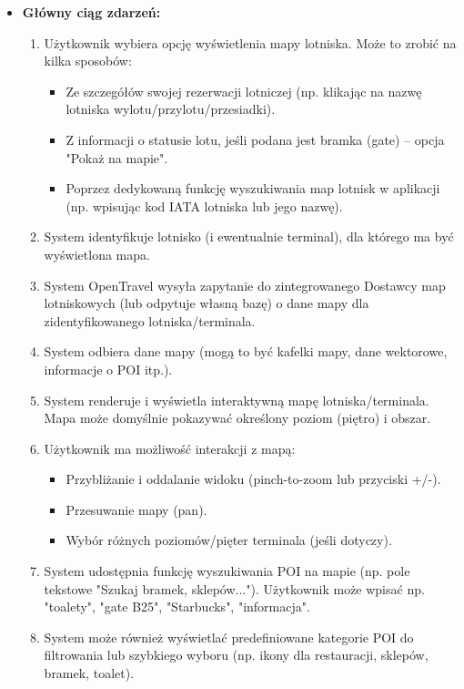 \documentclass[a4paper,12pt]{article}
\begin{document}
\begin{itemize}
\begin{itemize}
        \end{itemize}
    \item \textbf{Główny ciąg zdarzeń:}
        \begin{enumerate}
            \item Użytkownik wybiera opcję wyświetlenia mapy lotniska. Może to zrobić na kilka sposobów:
                \begin{itemize}
                    \item Ze szczegółów swojej rezerwacji lotniczej (np. klikając na nazwę lotniska wylotu/przylotu/przesiadki).
                    \item Z informacji o statusie lotu, jeśli podana jest bramka (gate) – opcja "Pokaż na mapie".
                    \item Poprzez dedykowaną funkcję wyszukiwania map lotnisk w aplikacji (np. wpisując kod IATA lotniska lub jego nazwę).
                \end{itemize}
            \item System identyfikuje lotnisko (i ewentualnie terminal), dla którego ma być wyświetlona mapa.
            \item System OpenTravel wysyła zapytanie do zintegrowanego Dostawcy map lotniskowych (lub odpytuje własną bazę) o dane mapy dla zidentyfikowanego lotniska/terminala.
            \item System odbiera dane mapy (mogą to być kafelki mapy, dane wektorowe, informacje o POI itp.).
            \item System renderuje i wyświetla interaktywną mapę lotniska/terminala. Mapa może domyślnie pokazywać określony poziom (piętro) i obszar.
            \item Użytkownik ma możliwość interakcji z mapą:
                \begin{itemize}
                    \item Przybliżanie i oddalanie widoku (pinch-to-zoom lub przyciski +/-).
                    \item Przesuwanie mapy (pan).
                    \item Wybór różnych poziomów/pięter terminala (jeśli dotyczy).
                \end{itemize}
            \item System udostępnia funkcję wyszukiwania POI na mapie (np. pole tekstowe "Szukaj bramek, sklepów..."). Użytkownik może wpisać np. "toalety", "gate B25", "Starbucks", "informacja".
            \item System może również wyświetlać predefiniowane kategorie POI do filtrowania lub szybkiego wyboru (np. ikony dla restauracji, sklepów, bramek, toalet).

\end{enumerate}
\end{itemize}
\end{document}
